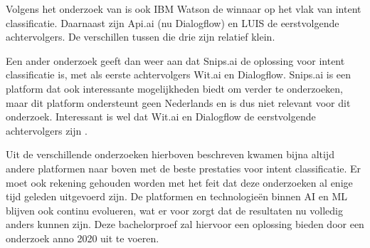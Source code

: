 Volgens het onderzoek van \textcite{Savenkov2017} is ook IBM Watson de winnaar op het vlak van intent classificatie. Daarnaast zijn Api.ai (nu Dialogflow) en LUIS de eerstvolgende achtervolgers. De verschillen tussen die drie zijn relatief klein.

Een ander onderzoek geeft dan weer aan dat Snips.ai de oplossing voor intent classificatie is,  met als eerste achtervolgers Wit.ai en Dialogflow. Snips.ai is een platform dat ook interessante mogelijkheden biedt om verder te onderzoeken, maar dit platform ondersteunt geen Nederlands en is dus niet relevant voor dit onderzoek. Interessant is wel dat Wit.ai en Dialogflow de eerstvolgende achtervolgers zijn \autocite{Coucke2017}.

Uit de verschillende onderzoeken hierboven beschreven kwamen bijna altijd andere platformen naar boven met de beste prestaties voor intent classificatie. Er moet ook rekening gehouden worden met het feit dat deze onderzoeken al enige tijd geleden uitgevoerd zijn. De platformen en technologieën binnen AI en ML blijven ook continu evolueren, wat er voor zorgt dat de resultaten nu volledig anders kunnen zijn. Deze bachelorproef zal hiervoor een oplossing bieden door een onderzoek anno 2020 uit te voeren.
















